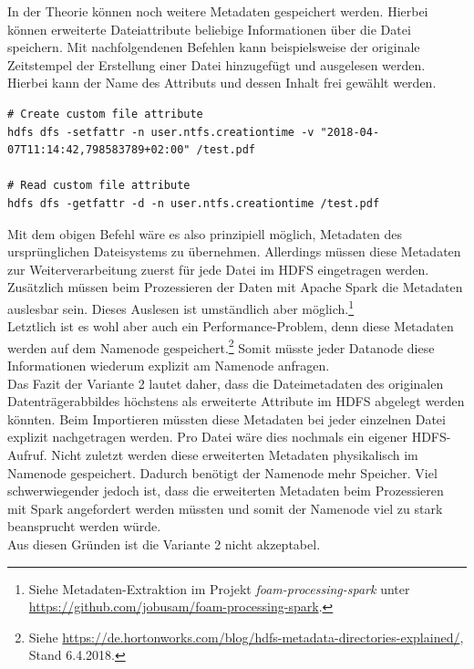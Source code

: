 \noindent
In der Theorie können noch weitere Metadaten gespeichert werden. Hierbei können erweiterte Dateiattribute beliebige Informationen über die Datei speichern. Mit nachfolgendenen Befehlen kann beispielsweise der originale Zeitstempel der Erstellung einer Datei hinzugefügt und ausgelesen werden. Hierbei kann der Name des Attributs und dessen Inhalt frei gewählt werden.
\begin{lstlisting}[label={lst:hdfs_fattr_command},caption= Befehl zum Hinzufügen und Auslesen von Metadaten,captionpos=b,frame=single,style=customshell]
# Create custom file attribute
hdfs dfs -setfattr -n user.ntfs.creationtime -v "2018-04-07T11:14:42,798583789+02:00" /test.pdf

# Read custom file attribute
hdfs dfs -getfattr -d -n user.ntfs.creationtime /test.pdf
\end{lstlisting}

\noindent
Mit dem obigen Befehl wäre es also prinzipiell möglich, Metadaten des ursprünglichen Dateisystems zu übernehmen. Allerdings müssen diese Metadaten zur Weiterverarbeitung zuerst für jede Datei im HDFS eingetragen werden.\\
Zusätzlich müssen beim Prozessieren der Daten mit Apache Spark die Metadaten auslesbar sein. Dieses Auslesen ist umständlich aber möglich.\footnote{Siehe Metadaten-Extraktion im Projekt \textit{foam-processing-spark} unter \url{https://github.com/jobusam/foam-processing-spark}.}\\ 
Letztlich ist es wohl aber auch ein Performance-Problem, denn diese Metadaten werden auf dem Namenode gespeichert.\footnote{Siehe \url{https://de.hortonworks.com/blog/hdfs-metadata-directories-explained/}, Stand 6.4.2018.} Somit müsste jeder Datanode diese Informationen wiederum explizit am Namenode anfragen.\\

\noindent
Das Fazit der Variante 2 lautet daher, dass die Dateimetadaten des originalen Datenträgerabbildes höchstens als erweiterte Attribute im HDFS abgelegt werden könnten. Beim Importieren müssten diese Metadaten bei jeder einzelnen Datei explizit nachgetragen werden. Pro Datei wäre dies nochmals ein eigener HDFS-Aufruf. Nicht zuletzt werden diese erweiterten Metadaten physikalisch im Namenode gespeichert. Dadurch benötigt der Namenode mehr Speicher. Viel schwerwiegender jedoch ist, dass die erweiterten Metadaten beim Prozessieren mit Spark angefordert werden müssten und somit der Namenode viel zu stark beansprucht werden würde.\\
Aus diesen Gründen ist die Variante 2 nicht akzeptabel. 

